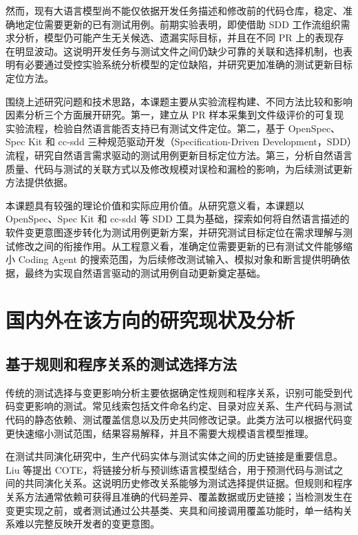 然而，现有大语言模型尚不能仅依据开发任务描述和修改前的代码仓库，稳定、准确地定位需要更新的已有测试用例。前期实验表明，即使借助 SDD 工作流组织需求分析，模型仍可能产生无关候选、遗漏实际目标，并且在不同 PR 上的表现存在明显波动。这说明开发任务与测试文件之间仍缺少可靠的关联和选择机制，也表明有必要通过受控实验系统分析模型的定位缺陷，并研究更加准确的测试更新目标定位方法。

围绕上述研究问题和技术思路，本课题主要从实验流程构建、不同方法比较和影响因素分析三个方面展开研究。第一，建立从 PR 样本采集到文件级评价的可复现实验流程，检验自然语言能否支持已有测试文件定位。第二，基于 OpenSpec、Spec Kit 和 cc-sdd 三种规范驱动开发（Specification-Driven Development，SDD）流程，研究自然语言需求驱动的测试用例更新目标定位方法。第三，分析自然语言质量、代码与测试的关联方式以及修改规模对误检和漏检的影响，为后续测试更新方法提供依据。

本课题具有较强的理论价值和实际应用价值。从研究意义看，本课题以 OpenSpec、Spec Kit 和 cc-sdd 等 SDD 工具为基础，探索如何将自然语言描述的软件变更意图逐步转化为测试用例更新方案，并研究测试目标定位在需求理解与测试修改之间的衔接作用。从工程意义看，准确定位需要更新的已有测试文件能够缩小 Coding Agent 的搜索范围，为后续修改测试输入、模拟对象和断言提供明确依据，最终为实现自然语言驱动的测试用例自动更新奠定基础。

\section{国内外在该方向的研究现状及分析}

\subsection{基于规则和程序关系的测试选择方法}

传统的测试选择与变更影响分析主要依据确定性规则和程序关系，识别可能受到代码变更影响的测试。常见线索包括文件命名约定、目录对应关系、生产代码与测试代码的静态依赖、测试覆盖信息以及历史共同修改记录。此类方法可以根据代码变更快速缩小测试范围，结果容易解释，并且不需要大规模语言模型推理。

在测试共同演化研究中，生产代码实体与测试实体之间的历史链接是重要信息。Liu 等\cite{liu2025cote}提出 COTE，将链接分析与预训练语言模型结合，用于预测代码与测试之间的共同演化关系。这说明历史修改关系能够为测试选择提供证据。但规则和程序关系方法通常依赖可获得且准确的代码差异、覆盖数据或历史链接；当检测发生在变更实现之前，或者测试通过公共基类、夹具和间接调用覆盖功能时，单一结构关系难以完整反映开发者的变更意图。

